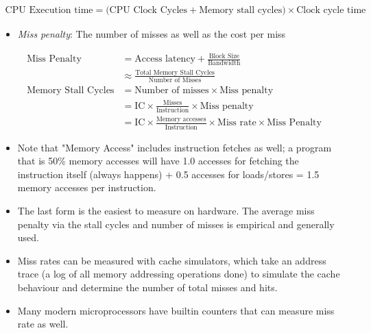 \begin{align*}
  \text{CPU Execution time} = \text{(CPU Clock Cycles} + \text{Memory stall cycles)} \times \text{Clock cycle time}
\end{align*}
\begin{itemize}
  \item \textit{Miss penalty}: The number of misses as well as the cost per miss
\end{itemize}
\begin{align*}
\text{Miss Penalty} &= \text{Access latency} + \frac{\text{Block Size}}{\text{Bandwidth}} \\
& \approx \frac{\text{Total Memory Stall Cycles}}{\text{Number of Misses}} \\
\text{Memory Stall Cycles} &= \text{Number of misses} \times \text{Miss penalty} \\ 
&= \text{IC} \times \frac{\text{Misses}}{\text{Instruction}} \times \text{Miss penalty} \\ 
&= \text{IC} \times \frac{\text{Memory accesses}}{\text{Instruction}} \times \text{Miss rate} \times \text{Miss Penalty}
\end{align*}
\begin{itemize}
  \item Note that "Memory Access" includes instruction fetches as well; a program that is 50\% memory accesses will have 1.0 accesses for fetching the instruction itself (always happens) + 0.5 accesses for loads/stores = 1.5 memory accesses per instruction.
  \item The last form is the easiest to measure on hardware. The average miss penalty via the stall cycles and number of misses is empirical and generally used.
  \item Miss rates can be measured with cache simulators, which take an address trace (a log of all memory addressing operations done) to simulate the cache behaviour and determine the number of total misses and hits.
  \item Many modern microprocessors have builtin counters that can measure miss rate as well.
\end{itemize}
